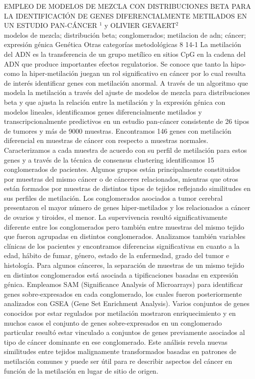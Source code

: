 \A
{EMPLEO DE MODELOS DE MEZCLA CON DISTRIBUCIONES BETA PARA LA IDENTIFICACIÓN DE GENES DIFERENCIALMENTE METILADOS EN UN ESTUDIO PAN-CÁNCER}
{$^1$ y OLIVIER GEVAERT$^2$}
{
\\}
{modelos de mezcla; distribución beta; conglomerados; metilacion de adn; cáncer; expresión génica} 
 {Genética} 
 {Otras categorías metodológicas} 
 {8} 
 {14-1}
{La metilación del ADN es la transferencia de un grupo metílico en sitios CpG en la cadena del ADN que produce importantes efectos regulatorios. Se conoce que tanto la hipo- como la hiper-metilación juegan un rol significativo en cáncer por lo cual resulta de interés identificar genes con metilación anormal. A través de un algoritmo que modela la metilación a través del ajuste de modelos de mezcla para distribuciones beta y que ajusta la relación entre la metilación y la expresión génica con modelos lineales, identificamos genes diferencialmente metilados y transcripcionalmente predictivos en un estudio pan-cáncer consistente de 26 tipos de tumores y más de 9000 muestras. Encontramos 146 genes con metilación diferencial en muestras de cáncer con respecto a muestras normales. Caracterizamos a cada muestra de acuerdo con su perfil de metilación para estos genes y a través de la técnica de consensus clustering identificamos 15 conglomerados de pacientes. Algunos grupos están principalmente constituidos por muestras del mismo cáncer o de cánceres relacionados, mientras que otros están formados por muestras de distintos tipos de tejidos reflejando similitudes en sus perfiles de metilación. Los conglomerados asociados a tumor cerebral presentaron el mayor número de genes hiper-metilados y los relacionados a cáncer de ovarios y tiroides, el menor. La supervivencia resultó significativamente diferente entre los conglomerados pero también entre muestras del mismo tejido que fueron agrupadas en distintos conglomerados. Analizamos también variables clínicas de los pacientes y encontramos diferencias significativas en cuanto a la edad, hábito de fumar, género, estado de la enfermedad, grado del tumor e histología. Para algunos cánceres, la separación de muestras de un mismo tejido en distintos conglomerados está asociada a tipificaciones basadas en expresión génica. Empleamos SAM (Significance Analysis of Microarrays) para identificar genes sobre-expresados en cada conglomerado, los cuales fueron posteriormente analizados con GSEA (Gene Set Enrichment Analysis). Varios conjuntos de genes conocidos por estar regulados por metilación mostraron enriquecimiento y en muchos casos el conjunto de genes sobre-expresados en un conglomerado particular resultó estar vinculado a conjuntos de genes previamente asociados al tipo de cáncer dominante en ese conglomerado. Este análisis revela nuevas similitudes entre tejidos malignamente transformados basadas en patrones de metilación comunes y puede ser útil para re describir aspectos del cáncer en función de la metilación en lugar de sitio de origen.}
